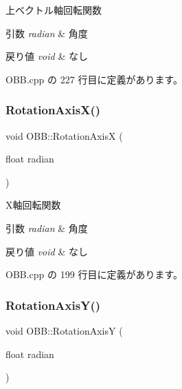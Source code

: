 上ベクトル軸回転関数 


\begin{DoxyParams}{引数}
{\em radian} & 角度 \\
\hline
\end{DoxyParams}

\begin{DoxyRetVals}{戻り値}
{\em void} & なし \\
\hline
\end{DoxyRetVals}


 O\+B\+B.\+cpp の 227 行目に定義があります。

\mbox{\label{class_o_b_b_a5e298111d87b16034c6d0f3753ee8eb9}} 
\subsubsection{\texorpdfstring{Rotation\+Axis\+X()}{RotationAxisX()}}
{\footnotesize\ttfamily void O\+B\+B\+::\+Rotation\+AxisX (\begin{DoxyParamCaption}\item[{float}]{radian }\end{DoxyParamCaption})}



X軸回転関数 


\begin{DoxyParams}{引数}
{\em radian} & 角度 \\
\hline
\end{DoxyParams}

\begin{DoxyRetVals}{戻り値}
{\em void} & なし \\
\hline
\end{DoxyRetVals}


 O\+B\+B.\+cpp の 199 行目に定義があります。

\mbox{\label{class_o_b_b_a8add6096a19079f1eb89d881d5dd355b}} 
\subsubsection{\texorpdfstring{Rotation\+Axis\+Y()}{RotationAxisY()}}
{\footnotesize\ttfamily void O\+B\+B\+::\+Rotation\+AxisY (\begin{DoxyParamCaption}\item[{float}]{radian }\end{DoxyParamCaption})}



